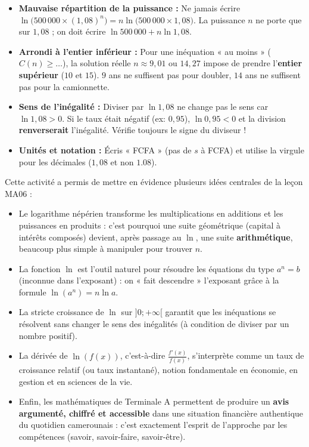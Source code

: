 \documentclass[11pt]{article}
\newcommand{\cle}[1]{{\popxbold\color{popdark}#1}}
\newcounter{popsec}
\newcounter{popsub}
\newcommand{\courssub}[1]{%
  \stepcounter{popsub}%
  \par\vspace{9pt}\noindent{\popxbold\fontsize{11.5}{13}\selectfont\color{popink}{\color{poporange}\thepopsec.\thepopsub}\hspace{6pt}#1}\par\nopagebreak\vspace{4pt}
}
\begin{document}
\begin{attention}
\begin{itemize}
\item \textbf{Mauvaise répartition de la puissance :} Ne jamais écrire $\ln\big(500\,000 \times (1,08)^n\big) = n \ln\big(500\,000 \times 1,08\big)$. La puissance $n$ ne porte que sur $1,08$ ; on doit écrire $\ln 500\,000 + n \ln 1,08$.
\item \textbf{Arrondi à l'entier inférieur :} Pour une inéquation « au moins » ($C(n) \geq \dots$), la solution réelle $n \approx 9,01$ ou $14,27$ impose de prendre l'\textbf{entier supérieur} ($10$ et $15$). $9$ ans ne suffisent pas pour doubler, $14$ ans ne suffisent pas pour la camionnette.
\item \textbf{Sens de l'inégalité :} Diviser par $\ln 1,08$ ne change pas le sens car $\ln 1,08 > 0$. Si le taux était négatif (ex: $0,95$), $\ln 0,95 < 0$ et la division \textbf{renverserait} l'inégalité. Vérifie toujours le signe du diviseur !
\item \textbf{Unités et notation :} Écris « FCFA » (pas de $s$ à FCFA) et utilise la virgule pour les décimales ($1,08$ et non $1.08$).
\end{itemize}
\end{attention}

\courssub{Bilan de l'activité}

Cette activité a permis de mettre en évidence plusieurs idées centrales de la leçon MA06 :
\begin{itemize}
\item Le logarithme népérien \cle{transforme les multiplications en additions} et les puissances en produits : c'est pourquoi une suite géométrique (capital à intérêts composés) devient, après passage au $\ln$, une suite \textbf{arithmétique}, beaucoup plus simple à manipuler pour trouver $n$.
\item La fonction $\ln$ est l'outil naturel pour résoudre les équations du type $a^n = b$ (inconnue dans l'exposant) : on « fait descendre » l'exposant grâce à la formule $\ln(a^n) = n\ln a$.
\item La \cle{stricte croissance} de $\ln$ sur $]0;+\infty[$ garantit que les inéquations se résolvent sans changer le sens des inégalités (à condition de diviser par un nombre positif).
\item La dérivée de $\ln(f(x))$, c'est-à-dire $\frac{f'(x)}{f(x)}$, s'interprète comme un \cle{taux de croissance relatif} (ou taux instantané), notion fondamentale en économie, en gestion et en sciences de la vie.
\item Enfin, les mathématiques de Terminale A permettent de produire un \textbf{avis argumenté, chiffré et accessible} dans une situation financière authentique du quotidien camerounais : c'est exactement l'esprit de l'approche par les compétences (savoir, savoir-faire, savoir-être).
\end{itemize}
\end{document}
